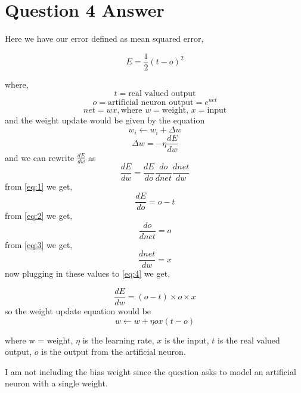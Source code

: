 \documentclass{article}
\begin{document}
\section*{Question 4 Answer}

Here we have our error defined as mean squared error,

\begin{equation}
\label{eq:1}
    E = \frac{1}{2}(t - o)^2
\end{equation}

where,
\begin{displaymath}
    t = \mbox{real valued output}
\end{displaymath}
\begin{equation}
\label{eq:2}
    o = \mbox{artificial neuron output} = e^{net}
\end{equation}
\begin{equation}
\label{eq:3}
    net = wx, \mbox{where } w = \mbox{weight, } x = \mbox{input}
\end{equation}
%
and the weight update would be given by the equation
\begin{displaymath}
    w_i \leftarrow w_i + \Delta w
\end{displaymath}
\begin{displaymath}
    \Delta w = - \eta \frac{dE}{dw}
\end{displaymath}
%
and we can rewrite $\frac{dE}{dw}$ as
\begin{equation}
    \label{eq:4}
    \frac{dE}{dw} = \frac{dE}{do} \frac{do}{dnet} \frac{dnet}{dw}
\end{equation}
%
from \eqref{eq:1} we get,
\begin{equation}
    \label{eq:4}
    \frac{dE}{do} = o - t
\end{equation}
%
from \eqref{eq:2} we get,
\begin{equation}
    \label{eq:5}
    \frac{do}{dnet} = o
\end{equation}
%
from \eqref{eq:3} we get,
\begin{equation}
    \label{eq:6}
    \frac{dnet}{dw} = x
\end{equation}
%
now plugging in these values to \eqref{eq:4} we get,

\begin{displaymath}
    \frac{dE}{dw} = (o - t) \times o \times x
\end{displaymath}
%
so the weight update equation would be
\begin{displaymath}
    w \leftarrow w + \eta ox(t - o)
\end{displaymath}

where w = weight, $\eta$ is the learning rate, $x$ is the input, $t$ is the real valued output, $o$ is the output from the artificial neuron.

I am not including the bias weight since the question asks to model an artificial neuron with a single weight.
\end{document}
